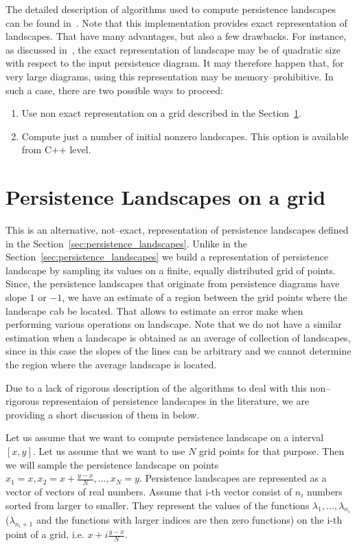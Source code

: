 \documentclass[11pt]{article}
\begin{document}
The detailed description of algorithms used to compute persistence landscapes can be found in~\cite{landscapes2}. Note that this implementation provides exact representation of landscapes. That have many advantages, but also a few drawbacks. For instance, as discussed in~\cite{landscapes2}, the exact representation of landscape may be of quadratic size with respect to the input persistence diagram. It may therefore happen that, for very large diagrams, using this representation may be memory--prohibitive. In such a case, there are two possible ways to proceed:
\begin{enumerate}
\item Use non exact representation on a grid described in the Section~\ref{sec:landscapes_on_grid}.
\item Compute just a number of initial nonzero landscapes. This option is available from C++ level. 
\end{enumerate}



\section{Persistence Landscapes on a grid}
\label{sec:landscapes_on_grid}
This is an alternative, not--exact, representation of persistence landscapes defined in the Section~\ref{sec:persistence_landscapes}. Unlike in the Section~\ref{sec:persistence_landscapes} we build a representation of persistence landscape by sampling its values on a finite, equally distributed grid of points. Since, the persistence landscapes that originate from persistence diagrams have slope $1$ or $-1$, we have an estimate of a region between the grid points where the landscape cab be located. That allows to estimate an error make when performing various operations on landscape. Note that we do not have a similar estimation when a landscape is obtained as an average of collection of landscapes, since in this case the slopes of the lines can be arbitrary and we cannot determine the region where the average landscape is located. 

Due to a lack of rigorous description of the algorithms to deal with this non--rigorous representaion of persistence landscapes in the literature, we are providing a short discussion of them in below.

Let us assume that we want to compute persistence landscape on a interval $[x,y]$. Let us assume that we want to use $N$ grid points for that purpose. Then we will sample the persistence landscape on points $x_1 = x , x_2 = x + \frac{y-x}{N}, \ldots , x_{N} = y$. Persistence landscapes are represented as a vector of vectors of real numbers. Assume that i-th vector consist of $n_i$ numbers sorted from larger to smaller. They represent the values of the functions $\lambda_1,\ldots,\lambda_{n_i}$ ($\lambda_{n_i+1}$ and the functions with larger indices are then zero functions) on the i-th point of a grid, i.e. $x + i \frac{y-x}{N}$. 
\end{document}
